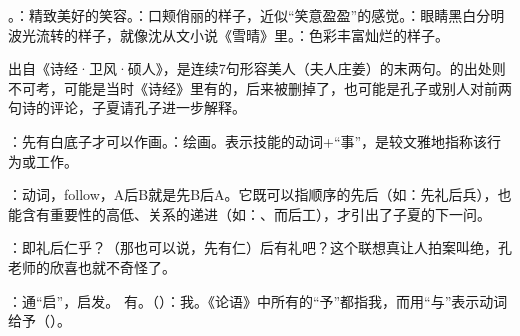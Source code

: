 {
\begin{lyblobitemize}
\item {}。：精致美好的笑容。：口颊俏丽的样子，近似“笑意盈盈”的感觉。：眼睛黑白分明波光流转的样子，就像沈从文小说《雪晴》里。：色彩丰富灿烂的样子。

出自《诗经·卫风·硕人》，是连续7句形容美人（夫人庄姜）的末两句。的出处则不可考，可能是当时《诗经》里有的，后来被删掉了，也可能是孔子或别人对前两句诗的评论，子夏请孔子进一步解释。
\item {}：先有白底子才可以作画。：绘画。表示技能的动词+“事”，是较文雅地指称该行为或工作。

：动词，follow，A后B就是先B后A。它既可以指顺序的先后（如：先礼后兵），也能含有重要性的高低、关系的递进（如：、而后工），才引出了子夏的下一问。

\item {}：即礼后仁乎？（那也可以说，先有仁）后有礼吧？这个联想真让人拍案叫绝，孔老师的欣喜也就不奇怪了。
\item {}：通“启”，启发。 有。（）：我。《论语》中所有的“予”都指我，而用“与”表示动词给予（）。
\end{lyblobitemize}
}
{}
%


